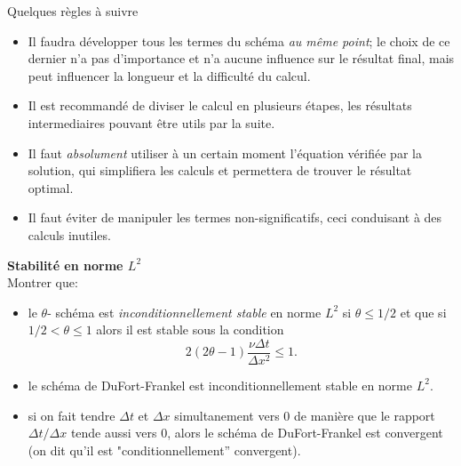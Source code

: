 \documentclass[12pt,a4paper]{article}
\begin{document}
\begin{enumerate}
Quelques r\`egles \`a suivre 
\begin{itemize}
\item Il faudra d\'evelopper tous les termes du sch\'ema {\it au
    m\^eme point}; le choix de ce dernier n'a pas d'importance et n'a
  aucune influence sur le r\'esultat final, mais peut influencer la
  longueur et la difficult\'e du calcul.
\item Il est recommand\'e de diviser le calcul en plusieurs \'etapes,
  les r\'esultats intermediaires pouvant \^etre utils par la suite.
\item Il faut {\it absolument} utiliser \`a un certain moment
  l'\'equation v\'erifi\'ee par la solution, qui simplifiera les
  calculs et permettera de trouver le r\'esultat optimal.
\item Il faut \'eviter de manipuler les termes non-significatifs, ceci
  conduisant \`a des calculs inutiles.
\end{itemize}

{\bf Stabilit\'e en norme $L^2$}\\
Montrer que:
\begin{itemize}
\item le $\theta$- sch\'ema est
{\it inconditionnellement stable} en norme $L^2$ si $\theta \le 1/2$ et que si $1/2 < \theta \le 1$ alors il est
stable sous la condition $$2(2\theta-1)\frac{\nu\Delta
    t}{\Delta x^2} \le 1.$$ 
    \item le sch\'ema de DuFort-Frankel est inconditionnellement
stable en norme $L^2$.
\item si on fait tendre $\Delta t$ et
$\Delta x$ simultanement vers $0$ de mani\`ere que le rapport $\Delta
t/\Delta x$ tende aussi vers $0$, alors le sch\'ema de DuFort-Frankel
est convergent (on dit qu'il est "conditionnellement'' convergent).  
\end{itemize}



\end{enumerate}

\end{document}
